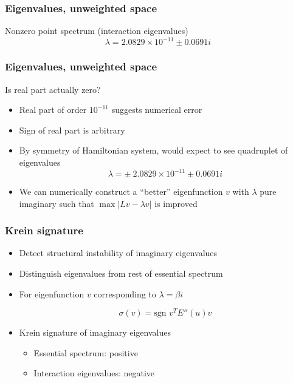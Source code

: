\documentclass[16pt]{beamer}
\begin{document}
\begin{frame}
	\frametitle{Eigenvalues, unweighted space}
	\fontsize{16}{7.2}\selectfont
	\begin{block}{Nonzero point spectrum (interaction eigenvalues)}
		\[ \lambda = 2.0829 \times 10^{-11} \pm 0.0691i \]
	\end{block}
\end{frame}

\begin{frame}
	\frametitle{Eigenvalues, unweighted space}
	\fontsize{14}{7.2}\selectfont
	Is real part actually zero?
	\begin{itemize}
		\item<1->Real part of order $10^{-11}$ suggests numerical error
		\item<2->Sign of real part is arbitrary
		\item<3->By symmetry of Hamiltonian system, would expect to see quadruplet of eigenvalues
		 \[ \lambda = \pm \: 2.0829 \times 10^{-11} \pm 0.0691i \]
		\item<4-> We can numerically construct a ``better'' eigenfunction $v$ with $\lambda$ pure imaginary such that $\max |Lv - \lambda v|$ is improved
	\end{itemize}
\end{frame}

\begin{frame}
	\frametitle{Krein signature}
	\fontsize{14}{7.2}\selectfont
	\begin{itemize}
		\item Detect structural instability of imaginary eigenvalues
		\item Distinguish eigenvalues from rest of essential spectrum
		\item For eigenfunction $v$ corresponding to $\lambda = \beta i$
		\begin{center}
			\[ \sigma(v) = \text{sgn }v^T E''(u) v \]
		\end{center}
		\item Krein signature of imaginary eigenvalues
		\begin{itemize}
			\item \large Essential spectrum: positive
			\item Interaction eigenvalues: negative
		\end{itemize}
	\end{itemize}
\end{frame}
\end{document}
